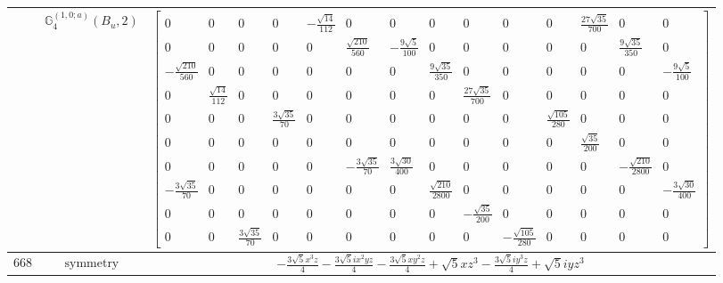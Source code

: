 \documentclass[fleqn,8pt,landscape]{jsarticle}
\begin{document}
\begin{longtable}{ccc}
$  $ & $ \mathbb{G}_{4}^{(1,0;a)}(B_{u},2) $ & $ \begin{bmatrix} 0 & 0 & 0 & 0 & - \frac{\sqrt{14}}{112} & 0 & 0 & 0 & 0 & 0 & 0 & \frac{27 \sqrt{35}}{700} & 0 & 0 \\ 0 & 0 & 0 & 0 & 0 & \frac{\sqrt{210}}{560} & - \frac{9 \sqrt{5}}{100} & 0 & 0 & 0 & 0 & 0 & \frac{9 \sqrt{35}}{350} & 0 \\ - \frac{\sqrt{210}}{560} & 0 & 0 & 0 & 0 & 0 & 0 & \frac{9 \sqrt{35}}{350} & 0 & 0 & 0 & 0 & 0 & - \frac{9 \sqrt{5}}{100} \\ 0 & \frac{\sqrt{14}}{112} & 0 & 0 & 0 & 0 & 0 & 0 & \frac{27 \sqrt{35}}{700} & 0 & 0 & 0 & 0 & 0 \\ 0 & 0 & 0 & \frac{3 \sqrt{35}}{70} & 0 & 0 & 0 & 0 & 0 & 0 & \frac{\sqrt{105}}{280} & 0 & 0 & 0 \\ 0 & 0 & 0 & 0 & 0 & 0 & 0 & 0 & 0 & 0 & 0 & \frac{\sqrt{35}}{200} & 0 & 0 \\ 0 & 0 & 0 & 0 & 0 & - \frac{3 \sqrt{35}}{70} & \frac{3 \sqrt{30}}{400} & 0 & 0 & 0 & 0 & 0 & - \frac{\sqrt{210}}{2800} & 0 \\ - \frac{3 \sqrt{35}}{70} & 0 & 0 & 0 & 0 & 0 & 0 & \frac{\sqrt{210}}{2800} & 0 & 0 & 0 & 0 & 0 & - \frac{3 \sqrt{30}}{400} \\ 0 & 0 & 0 & 0 & 0 & 0 & 0 & 0 & - \frac{\sqrt{35}}{200} & 0 & 0 & 0 & 0 & 0 \\ 0 & 0 & \frac{3 \sqrt{35}}{70} & 0 & 0 & 0 & 0 & 0 & 0 & - \frac{\sqrt{105}}{280} & 0 & 0 & 0 & 0 \end{bmatrix} $ \\ \hline
$ 668 $ & $ \text{symmetry} $ & $ - \frac{3 \sqrt{5} x^{3} z}{4} - \frac{3 \sqrt{5} i x^{2} y z}{4} - \frac{3 \sqrt{5} x y^{2} z}{4} + \sqrt{5} x z^{3} - \frac{3 \sqrt{5} i y^{3} z}{4} + \sqrt{5} i y z^{3} $ \\

\end{longtable}
\end{document}
